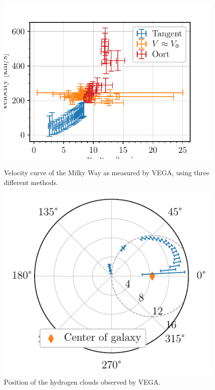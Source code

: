\begin{figure}[htbp]
    \begin{minipage}[t]{0.5\textwidth}
        \centering
        \captionsetup{width=.95\textwidth}
        \includegraphics[scale=1]{figures/VEGA2_velocity_curve.pdf}
        \caption{Velocity curve of the Milky Way as measured by VEGA, using three different methods.}
        \label{fig:VEGA_velocity_curve}
    \end{minipage}
    \begin{minipage}[t]{0.5\textwidth}
        \centering
        \captionsetup{width=.95\textwidth}
        \includegraphics[scale=1]{figures/VEGA_galaxy_map.pdf}
        \caption{Position of the hydrogen clouds observed by VEGA.}
        \label{fig:VEGA_galaxy_map}
    \end{minipage}
\end{figure}

